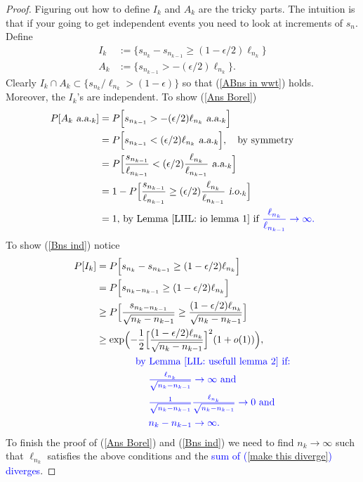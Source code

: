 \begin{proof}
Figuring out how to define $I_k$ and $A_k$ are the tricky parts. The intuition is that if your going to get independent events you need to look at increments of $s_{n}$. Define
\begin{align*}
I_k &:= \{s_{n_k}-s_{n_{k-1}} \geq (1-\epsilon/2)\ell_{n_k}  \} \\
A_k &:= \{ s_{n_{k-1}} > -(\epsilon/2)\ell_{n_k}  \}.
\end{align*}
Clearly  $I_k \cap A_k \subset \{s_{n_k}/\ell_{n_k} > (1-\epsilon)\}$ so that (\ref{ABns in wwt}) holds. Moreover, the $I_k$'s  are independent.
To show (\ref{Ans Borel})
\begin{align*}
P[A_k {\,\,\text{\sl a.a.} }_k] &= P\Bigl[s_{n_{k-1}} > -(\epsilon/2)\ell_{n_k} {\,\,\text{\sl a.a.} }_k\Bigr] \\
 &= P\Bigl[s_{n_{k-1}} < (\epsilon/2)\ell_{n_k} {\,\,\text{\sl a.a.} }_k\Bigr],\quad\text{by symmetry} \\
&= P\Bigl[\frac{s_{n_{k-1}}}{\ell_{n_{k-1}}} < (\epsilon/2)\frac{ \ell_{n_k} }{ \ell_{n_{k-1}} } {\,\,\text{\sl a.a.} }_k\Bigr] \\
&= 1- P\Bigl[\frac{s_{n_{k-1}}}{\ell_{n_{k-1}}} \geq (\epsilon/2)\frac{ \ell_{n_k} }{ \ell_{n_{k-1}} } {\,\,\text{\sl i.o.} }_k\Bigr] \\
&= 1,\,\text{by Lemma \ref{LIIL: io lemma 1} if \textcolor{blue}{$\frac{\ell_{n_k}}{\ell_{n_{k-1}}}\rightarrow \infty$.}}
\end{align*}
To show (\ref{Bns ind}) notice
\begin{align}
P[I_k] &= P\Bigl[ s_{n_k}-s_{n_{k-1}}\geq(1-\epsilon/2)\ell_{n_k}\Bigr] \nonumber\\
&= P\Bigl[s_{n_k-n_{k-1}}\geq(1-\epsilon/2)\ell_{n_k}\Bigr] \nonumber\\
&\geq P\Bigl[\frac{s_{n_k-n_{k-1}}}{\sqrt{n_k - n_{k-1}}}  \geq \frac{(1-\epsilon/2)\ell_{n_k}}{\sqrt{n_k - n_{k-1}}} \Bigr] \nonumber\\
&\geq \exp\Bigl(-\frac{1}{2}\Bigl[\frac{(1-\epsilon/2)\ell_{n_k}}{\sqrt{n_k - n_{k-1}}}\Bigr]^2(1+o(1))  \Bigr),\label{make this diverge}\\
&\qquad\qquad\text{\textcolor{blue}{by Lemma \ref{LIL: usefull lemma 2} if:}}\nonumber\\
&\qquad\qquad\quad\text{ \textcolor{blue}{$\textstyle\frac{\ell_{n_k}}{\sqrt{n_k - n_{k-1}}}\rightarrow \infty$ and  }}\nonumber\\
&\qquad\qquad\quad\text{ \textcolor{blue}{$\textstyle\frac{1}{\sqrt{n_k - n_{k-1}}}\frac{\ell_{n_k}}{\sqrt{n_k - n_{k-1}}}\rightarrow 0$ and }}\nonumber\\
&\qquad\qquad\quad\text{ \textcolor{blue}{$n_k - n_{k-1}\rightarrow \infty$. }}\nonumber
\end{align}
To finish the proof of (\ref{Ans Borel}) and (\ref{Bns ind}) we need to find $n_k\rightarrow \infty$ such that $\ell_{n_k}$ satisfies the above conditions and the \textcolor{blue}{sum of (\ref{make this diverge}) diverges}.


\end{proof}
